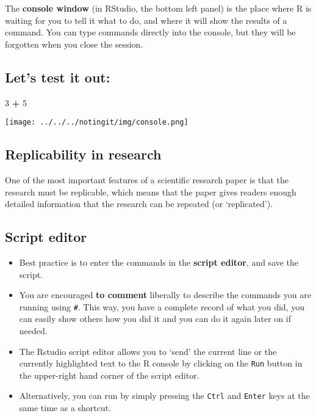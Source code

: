 \documentclass[
]{article}
\newenvironment{Shaded}{\begin{snugshade}}{\end{snugshade}}
\newcommand{\DecValTok}[1]{\textcolor[rgb]{0.00,0.00,0.81}{#1}}
\newcommand{\OperatorTok}[1]{\textcolor[rgb]{0.81,0.36,0.00}{\textbf{#1}}}
\newcommand{\StringTok}[1]{\textcolor[rgb]{0.31,0.60,0.02}{#1}}
\begin{document}
The \textbf{console window} (in RStudio, the bottom left panel) is the
place where R is waiting for you to tell it what to do, and where it
will show the results of a command. You can type commands directly into
the console, but they will be forgotten when you close the session.

\hypertarget{lets-test-it-out}{%
\subsection{Let's test it out:}\label{lets-test-it-out}}

\begin{Shaded}
\begin{Highlighting}[]
\DecValTok{3} \OperatorTok{+}\StringTok{ }\DecValTok{5}
\end{Highlighting}
\end{Shaded}

\texttt{[image: ../../../notingit/img/console.png]}

\hypertarget{replicability-in-research}{%
\subsection{Replicability in research}\label{replicability-in-research}}

One of the most important features of a scientific research paper is
that the research must be replicable, which means that the paper gives
readers enough detailed information that the research can be repeated
(or `replicated').

\hypertarget{script-editor}{%
\subsection{Script editor}\label{script-editor}}

\begin{itemize}
\item
  Best practice is to enter the commands in the \textbf{script editor},
  and save the script.
\item
  You are encouraged \textbf{to comment} liberally to describe the
  commands you are running using \texttt{\#}. This way, you have a
  complete record of what you did, you can easily show others how you
  did it and you can do it again later on if needed.
\item
  The Rstudio script editor allows you to `send' the current line or the
  currently highlighted text to the R console by clicking on the
  \texttt{Run} button in the upper-right hand corner of the script
  editor.
\item
  Alternatively, you can run by simply pressing the \texttt{Ctrl} and
  \texttt{Enter} keys at the same time as a shortcut.
\end{itemize}
\end{document}

